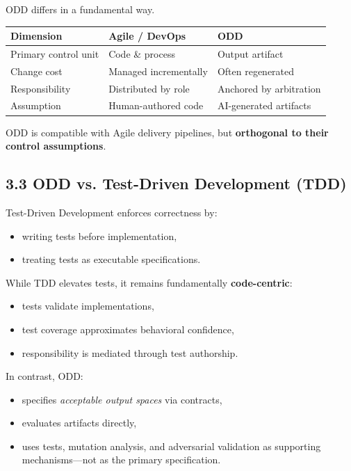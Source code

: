 \documentclass[
]{article}
\begin{document}
ODD differs in a fundamental way.

\begin{longtable}[]{@{}lll@{}}
\toprule()
Dimension & Agile / DevOps & ODD \\
\midrule()
\endhead
Primary control unit & Code \& process & Output artifact \\
Change cost & Managed incrementally & Often regenerated \\
Responsibility & Distributed by role & Anchored by arbitration \\
Assumption & Human-authored code & AI-generated artifacts \\
\bottomrule()
\end{longtable}

ODD is compatible with Agile delivery pipelines, but \textbf{orthogonal
to their control assumptions}.

\hypertarget{33-odd-vs-test-driven-development-tdd}{%
\subsection{3.3 ODD vs. Test-Driven Development
(TDD)}\label{33-odd-vs-test-driven-development-tdd}}

Test-Driven Development enforces correctness by:

\begin{itemize}
\item
  writing tests before implementation,
\item
  treating tests as executable specifications.
\end{itemize}

While TDD elevates tests, it remains fundamentally
\textbf{code-centric}:

\begin{itemize}
\item
  tests validate implementations,
\item
  test coverage approximates behavioral confidence,
\item
  responsibility is mediated through test authorship.
\end{itemize}

In contrast, ODD:

\begin{itemize}
\item
  specifies \emph{acceptable output spaces} via contracts,
\item
  evaluates artifacts directly,
\item
  uses tests, mutation analysis, and adversarial validation as
  supporting mechanisms---not as the primary specification.
\end{itemize}
\end{document}
